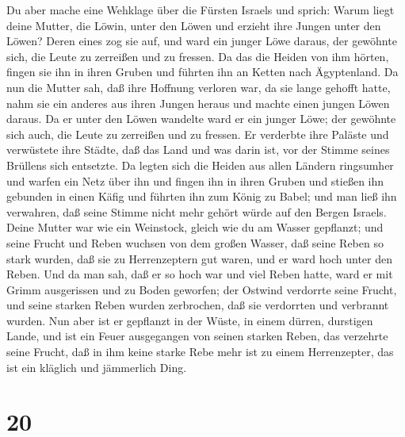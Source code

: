  Du aber mache eine Wehklage über die Fürsten Israels
 und sprich: Warum liegt deine Mutter, die Löwin, unter den
Löwen und erzieht ihre Jungen unter den Löwen?  Deren eines
zog sie auf, und ward ein junger Löwe daraus, der gewöhnte sich, die
Leute zu zerreißen und zu fressen.  Da das die Heiden von
ihm hörten, fingen sie ihn in ihren Gruben und führten ihn an Ketten
nach Ägyptenland.  Da nun die Mutter sah, daß ihre Hoffnung
verloren war, da sie lange gehofft hatte, nahm sie ein anderes aus ihren
Jungen heraus und machte einen jungen Löwen daraus.  Da er
unter den Löwen wandelte ward er ein junger Löwe; der gewöhnte sich
auch, die Leute zu zerreißen und zu fressen.  Er verderbte
ihre Paläste und verwüstete ihre Städte, daß das Land und was darin ist,
vor der Stimme seines Brüllens sich entsetzte.  Da legten
sich die Heiden aus allen Ländern ringsumher und warfen ein Netz über
ihn und fingen ihn in ihren Gruben  und stießen ihn gebunden
in einen Käfig und führten ihn zum König zu Babel; und man ließ ihn
verwahren, daß seine Stimme nicht mehr gehört würde auf den Bergen
Israels.  Deine Mutter war wie ein Weinstock, gleich wie du
am Wasser gepflanzt; und seine Frucht und Reben wuchsen von dem großen
Wasser,  daß seine Reben so stark wurden, daß sie zu
Herrenzeptern gut waren, und er ward hoch unter den Reben. Und da man
sah, daß er so hoch war und viel Reben hatte,  ward er mit
Grimm ausgerissen und zu Boden geworfen; der Ostwind verdorrte seine
Frucht, und seine starken Reben wurden zerbrochen, daß sie verdorrten
und verbrannt wurden.  Nun aber ist er gepflanzt in der
Wüste, in einem dürren, durstigen Lande,  und ist ein Feuer
ausgegangen von seinen starken Reben, das verzehrte seine Frucht, daß in
ihm keine starke Rebe mehr ist zu einem Herrenzepter, das ist ein
kläglich und jämmerlich Ding.

\hypertarget{section-19}{%
\section{20}\label{section-19}}

